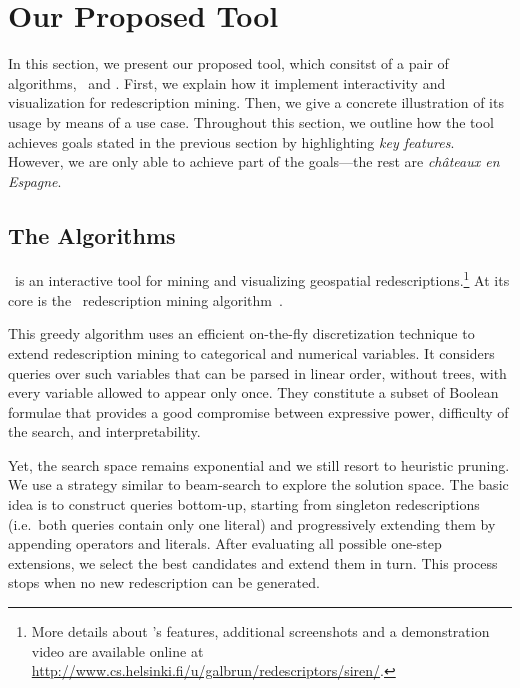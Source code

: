 \section{Our Proposed Tool}
In this section, we present our proposed tool, which consitst of a
pair of algorithms, \ReReMi\ and \Siren. First, we explain how it
implement interactivity and visualization for redescription mining.
Then, we give a concrete illustration of its usage by means of a use
case. Throughout this section, we outline how the tool achieves goals
stated in the previous section by highlighting \emph{key
  features}. However, we are only able to achieve part of the goals---the rest are \emph{ch\^{a}teaux en Espagne}.

\subsection{The Algorithms}
\label{sec:algorithms}

\Siren\ is
an interactive tool for mining and visualizing geospatial
redescriptions.\!\footnote{More details about \Siren's features, additional
  screenshots and a demonstration video are available online at
  \url{http://www.cs.helsinki.fi/u/galbrun/redescriptors/siren/}.}  At its core is the \ReReMi\ redescription mining
algorithm~\cite{galbrun11black,galbrun12black}.

This greedy algorithm
uses an efficient on-the-fly discretization technique to extend
redescription mining to categorical and numerical variables.
It considers queries over such variables that can be parsed in linear
order, without trees, with every variable allowed to appear only once.
They constitute a subset of Boolean formulae that
provides a good compromise between expressive power, difficulty of the
search, and interpretability.

Yet, the search space remains exponential and we still resort to
heuristic pruning.  We use a strategy similar to
beam-search to explore the solution space.  The basic idea is to
construct queries bottom-up, starting from singleton redescriptions
(i.e.\ both queries contain only one literal) and progressively
extending them by appending operators and
literals. %
After evaluating all possible one-step extensions, we select the best
candidates and extend them in turn. This process stops when no new
redescription can be generated.

